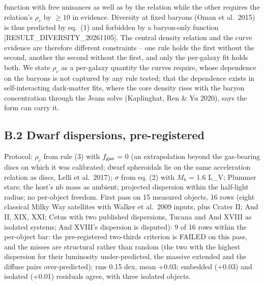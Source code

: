 \documentclass[
  10pt,
]{article}
\begin{document}
function with free nuisances as well as by the relation while the other requires the relation's $\rho_c$ by $\geq10$ in evidence. Diversity at fixed baryons (Oman et al.~2015) is thus predicted by eq.~(1) and forbidden by a baryon-only function {[}RESULT\_DIVERSITY\_20261105{]}. The central density relation and the curve evidence are therefore different constraints -- one rule holds the first without the second, another the second without the first, and only the per-galaxy fit holds both. We state $\rho_c$ as a per-galaxy quantity the curves require, whose dependence on the baryons is not captured by any rule tested; that the dependence exists in self-interacting dark-matter fits, where the core density rises with the baryon concentration through the Jeans solve (Kaplinghat, Ren \& Yu 2020), says the form can carry it.

\subsection{B.2 Dwarf dispersions, pre-registered}

Protocol: $\rho_c$ from rule (3) with $f_{\rm gas}$ = 0 (an extrapolation beyond the gas-bearing discs on which it was calibrated; dwarf spheroidals lie on the same acceleration relation as discs, Lelli et al.~2017); $\sigma$ from eq. (2) with $M_b$ = 1.6 L\_V; Plummer stars; the host's nb mass as ambient; projected dispersion within the half-light radius; no per-object freedom. First pass on 15 measured objects, 16 rows (eight classical Milky Way satellites with Walker et al.~2009 inputs, plus Crater II; And II, XIX, XXI; Cetus with two published dispersions, Tucana and And XVIII as isolated systems; And XVIII's dispersion is disputed): 9 of 16 rows within the per-object bar: the pre-registered two-thirds criterion is FAILED on this pass, and the misses are structural rather than random (the two with the highest dispersion for their luminosity under-predicted, the massive extended and the diffuse pairs over-predicted); rms 0.15 dex, mean +0.03; embedded (+0.03) and isolated (+0.01) residuals agree, with three isolated objects.
\end{document}
